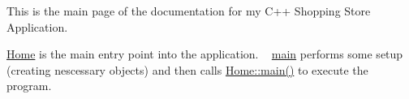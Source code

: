 This is the main page of the documentation for my C++ Shopping Store Application.

\mbox{\hyperlink{class_home_Home}{Home}} is the main entry point into the application. ~\newline
 \mbox{\hyperlink{main_8cpp_ae66f6b31b5ad750f1fe042a706a4e3d4}{main}} performs some setup (creating nescessary objects) and then calls \mbox{\hyperlink{class_home_af37e6f3e876567384e5bfe8a425cd7cd}{Home\+::main()}} to execute the program. 